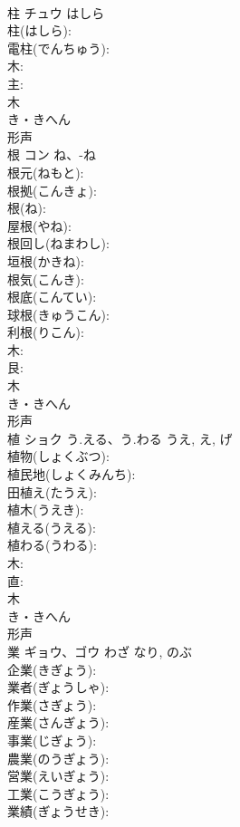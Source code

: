 \documentclass[8pt]{extreport}
\begin{document}
\begin{CJK}{UTF8}{min}
\\	柱	チュウ	はしら		
\\	柱(はしら): 
\\	電柱(でんちゅう): 
\\	木: 
\\	主: 
\\	木	
\\	き・きへん	
\\	形声 
\\	根	コン	ね、-ね		
\\	根元(ねもと): 
\\	根拠(こんきょ): 
\\	根(ね): 
\\	屋根(やね): 
\\	根回し(ねまわし): 
\\	垣根(かきね): 
\\	根気(こんき): 
\\	根底(こんてい): 
\\	球根(きゅうこん): 
\\	利根(りこん): 
\\	木: 
\\	艮: 
\\	木	
\\	き・きへん	
\\	形声 
\\	植	ショク	う.える、う.わる	うえ, え, げ	
\\	植物(しょくぶつ): 
\\	植民地(しょくみんち): 
\\	田植え(たうえ): 
\\	植木(うえき): 
\\	植える(うえる): 
\\	植わる(うわる): 
\\	木: 
\\	直: 
\\	木	
\\	き・きへん	
\\	形声 
\\	業	ギョウ、ゴウ	わざ	なり, のぶ	
\\	企業(きぎょう): 
\\	業者(ぎょうしゃ): 
\\	作業(さぎょう): 
\\	産業(さんぎょう): 
\\	事業(じぎょう): 
\\	農業(のうぎょう): 
\\	営業(えいぎょう): 
\\	工業(こうぎょう): 
\\	業績(ぎょうせき): 

\end{CJK}
\end{document}
